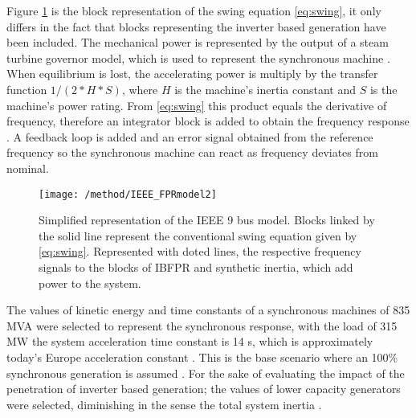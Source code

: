 Figure \ref{fig:ieeesimple} is the block representation of the swing equation \eqref{eq:swing}, it only differs in the fact that blocks representing the inverter based generation have been included. The mechanical power is represented by the output of a steam turbine governor model, which is used to represent the synchronous machine \cite{Anderson.2002}. When equilibrium is lost, the accelerating power is multiply by the transfer function $ 1/(2*H*S) $, where $ H $ is the machine’s inertia constant and $ S $ is the machine’s power rating. From \eqref{eq:swing} this product equals the derivative of frequency, therefore an integrator block is added to obtain the frequency response \cite{kundur1994power}\cite{john1994power}\cite{ogata1999ingenieria}. A feedback loop is added and an error signal obtained from the reference frequency so the synchronous machine can react as frequency deviates from nominal. \\ 

\begin{figure}[h]
	\centering
	\texttt{[image: /method/IEEE\_FPRmodel2]}
	\caption{Simplified representation of the IEEE 9 bus model. Blocks linked by the solid line represent the conventional swing equation given by \eqref{eq:swing}. Represented with doted lines, the respective frequency signals to the blocks of IBFPR and synthetic inertia, which add power to the system.}
	\label{fig:ieeesimple}
\end{figure}


The values of kinetic energy and time constants of a synchronous machines of 835 MVA were selected to represent the synchronous response, with the load of 315 MW the system acceleration time constant is 14 s, which is approximately today’s Europe acceleration constant \cite{ENTSOE.2016}. This is the base scenario where an 100\% synchronous generation is assumed . For the sake of evaluating the impact of the penetration of inverter based generation; the values of lower capacity generators were selected, diminishing in the sense the total system inertia \cite{Anderson.2002}.\\%





